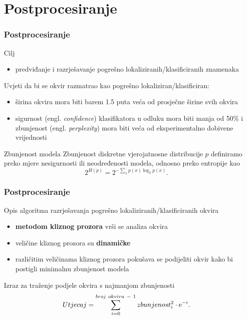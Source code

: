 \documentclass{beamer}
\begin{document}
\section{Postprocesiranje}
\begin{frame}
\frametitle{Postprocesiranje}
Cilj
\begin{itemize}
	\item predviđanje i razrješavanje pogrešno lokaliziranih/klasificiranih znamenaka
\end{itemize}
Uvjeti da bi se okvir razmatrao kao pogrešno lokaliziran/klasificiran:
\begin{itemize}
	\item širina okvira mora biti barem 1.5 puta veća od prosječne širine svih okvira
	\item sigurnost (engl. \textit{confidence}) klasifikatora u odluku mora biti manja od 50\% i zbunjenost (engl. \textit{perplexity}) mora biti veća od eksperimentalno dobivene vrijednosti
\end{itemize}
\begin{block}{Zbunjenost modela}
Zbunjenost diskretne vjerojatnosne distribucije $p$ definiramo preko mjere nesigurnosti ili neodređenosti modela, odnosno preko entropije kao 
\begin{equation}
2^{H(p)} = 2 ^ {- \sum_{x}^{}p(x)\log_{2}p(x)}.
\end{equation}
\end{block}
\end{frame}

\begin{frame}
	\frametitle{Postprocesiranje}
	Opis algoritma razrješavanja pogrešno lokaliziranih/klasificiranih okvira
	\begin{itemize}
		\item \textbf{metodom kliznog prozora} vrši se analiza okvira
		\item veličine kliznog prozora su \textbf{dinamičke}
		\item različitim veličinama kliznog prozora pokušava se podijeliti okvir kako bi postigli minimalnu zbunjenost modela
	\end{itemize}
\begin{block}{Izraz za traženje podjele okvira s najmanjom zbunjenosti}
	\begin{equation}
		Utjecaj = \sum_{i = 0}^{broj\ okvira\ -\ 1} zbunjenost_{i}^2 \cdot  {\rm e}^{-i}.
	\end{equation}	
\end{block}
\end{frame}
\end{document}
